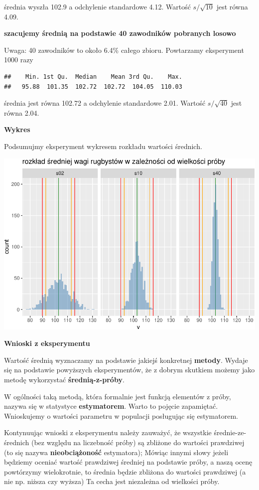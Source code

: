 \documentclass[
  openany]{book}
\begin{document}
średnia wyszła 102.9 a odchylenie standardowe
4.12.
Wartość \(s/\sqrt{10}\) jest równa 4.09.

\textbf{szacujemy średnią na podstawie 40 zawodników pobranych losowo}

Uwaga: 40 zawodników to około 6.4\%
całego zbioru.
Powtarzamy eksperyment 1000 razy

\begin{verbatim}
##    Min. 1st Qu.  Median    Mean 3rd Qu.    Max. 
##   95.88  101.35  102.72  102.72  104.05  110.03
\end{verbatim}

średnia jest równa 102.72 a odchylenie standardowe 2.01.
Wartość \(s/\sqrt{40}\) jest równa 2.04.

\textbf{Wykres}

Podsumujmy eksperyment wykresem rozkładu wartości średnich.

\includegraphics{_main_files/figure-latex/unnamed-chunk-26-1.pdf}

\textbf{Wnioski z eksperymentu}

Wartość średnią wyznaczamy na podstawie jakiejś konkretnej \textbf{metody}.
Wydaje się na podstawie powyższych eksperymentów, że z dobrym skutkiem
możemy jako metodę wykorzystać \textbf{średnią-z-próby}.

W ogólności taką metodą, która formalnie jest funkcją elementów z próby, nazywa się
w statystyce \textbf{estymatorem}. Warto to pojęcie zapamiętać. Wnioskujemy
o wartości parametru w populacji posługując się estymatorem.

Kontynuując wnioski z eksperymentu należy zauważyć, że
wszystkie średnie-ze-średnich (bez względu na liczebność próby) są zbliżone do wartości
prawdziwej (to się nazywa \textbf{nieobciążoność} estymatora);
Mówiąc innymi słowy jeżeli będziemy oceniać wartość prawdziwej średniej na podstawie próby,
a naszą ocenę powtórzymy wielokrotnie,
to średnia będzie zbliżona do wartości prawdziwej (a nie np. niższa czy wyższa)
Ta cecha jest niezależna od wielkości próby.
\end{document}
